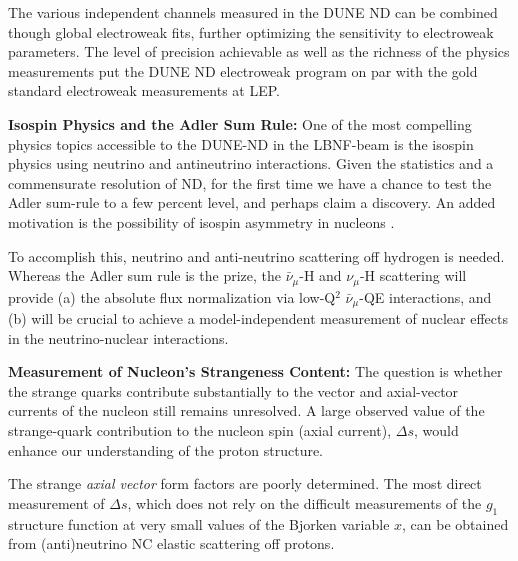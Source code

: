 The various independent channels measured in the DUNE ND can be combined though global electroweak fits, 
further optimizing the sensitivity to electroweak parameters. The level of precision achievable as well as the richness of 
the physics measurements put the DUNE ND electroweak program on par with the gold standard electroweak measurements at LEP.   



\vspace{0.25cm} 
\noindent 
{\bf Isospin Physics and the Adler Sum Rule:} One of the most compelling physics topics 
accessible to the DUNE-ND in the LBNF-beam is the isospin physics 
using neutrino and antineutrino interactions. Given the statistics and a commensurate 
resolution of ND, for the first time we have a chance to test the Adler sum-rule to a 
few percent level, and perhaps claim a discovery. 
An added motivation is the possibility of isospin asymmetry in nucleons . 

To accomplish this, neutrino and anti-neutrino scattering off hydrogen is needed. 
Whereas the Adler sum rule is the prize, the $\bar \nu_\mu$-H and $\nu_\mu$-H scattering
will provide (a)  the 
absolute flux normalization via low-Q$^2$ $\bar \nu_\mu$-QE interactions,  
and (b) will be crucial to achieve a model-independent measurement of nuclear effects in the 
neutrino-nuclear interactions. 

\vspace{0.25cm} 
\noindent 
{\bf Measurement of Nucleon's Strangeness Content:} The question is whether the strange
  quarks contribute substantially to the vector and axial-vector
  currents of the nucleon still remains unresolved. A large observed value of the
  strange-quark contribution to the nucleon spin (axial current),
  $\Delta s$, would enhance our understanding of the proton structure.

The strange \emph{axial vector} form factors are poorly 
determined. The most direct measurement of $\Delta s$, which does not rely on the difficult
measurements of the $g_1$ structure function at very small values of the Bjorken variable $x$, 
can be obtained from (anti)neutrino NC elastic scattering off protons.  %

